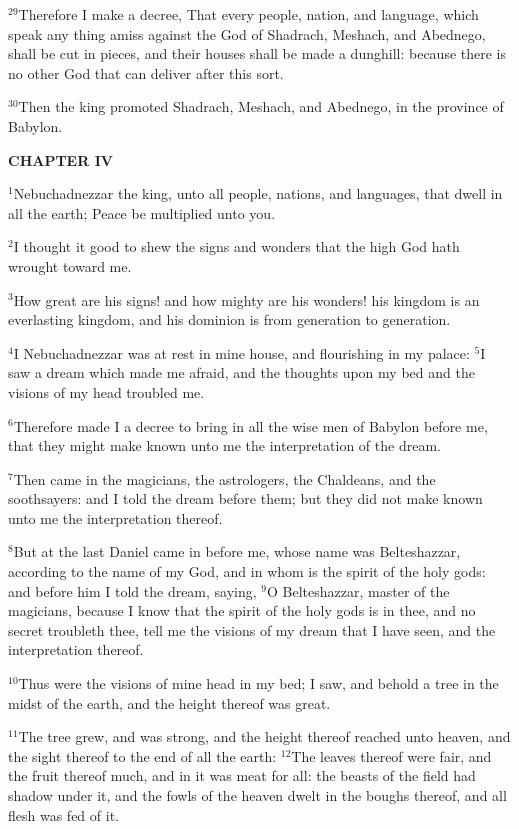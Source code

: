 \documentclass[12pt]{article}
\begin{document}
$^{29}$Therefore I make a decree, That every people, nation, and
language, which speak any thing amiss against the God of Shadrach,
Meshach, and Abednego, shall be cut in pieces, and their houses shall
be made a dunghill: because there is no other God that can deliver
after this sort.


$^{30}$Then the king promoted Shadrach, Meshach, and Abednego, in the
province of Babylon.





\begin{center}
\textbf{\small CHAPTER IV}
\end{center}
$^{1}$Nebuchadnezzar the king, unto all people, nations, and languages,
that dwell in all the earth; Peace be multiplied unto you.


$^{2}$I thought it good to shew the signs and wonders that the high God
hath wrought toward me.


$^{3}$How great are his signs! and how mighty are his wonders! his
kingdom is an everlasting kingdom, and his dominion is from generation
to generation.


$^{4}$I Nebuchadnezzar was at rest in mine house, and flourishing in my
palace: $^{5}$I saw a dream which made me afraid, and the thoughts upon
my bed and the visions of my head troubled me.


$^{6}$Therefore made I a decree to bring in all the wise men of Babylon
before me, that they might make known unto me the interpretation of
the dream.


$^{7}$Then came in the magicians, the astrologers, the Chaldeans, and
the soothsayers: and I told the dream before them; but they did not
make known unto me the interpretation thereof.


$^{8}$But at the last Daniel came in before me, whose name was
Belteshazzar, according to the name of my God, and in whom is the
spirit of the holy gods: and before him I told the dream, saying, $^{9}$O Belteshazzar, master of the magicians, because I know that the
spirit of the holy gods is in thee, and no secret troubleth thee, tell
me the visions of my dream that I have seen, and the interpretation
thereof.


$^{10}$Thus were the visions of mine head in my bed; I saw, and behold a
tree in the midst of the earth, and the height thereof was great.


$^{11}$The tree grew, and was strong, and the height thereof reached
unto heaven, and the sight thereof to the end of all the earth: $^{12}$The leaves thereof were fair, and the fruit thereof much, and in it
was meat for all: the beasts of the field had shadow under it, and the
fowls of the heaven dwelt in the boughs thereof, and all flesh was fed
of it.
\end{document}
